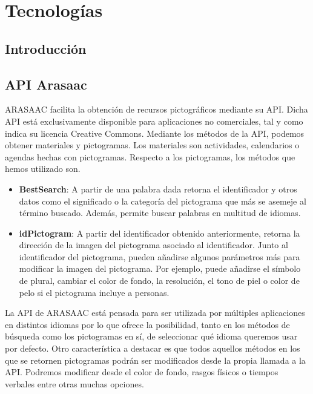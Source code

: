 \chapter{Tecnologías}
\label{cap:introduccion}


\begin{resumen}
	
\end{resumen}

\label{cap1:sec:Motivacion}


\section{Introducción}

\section{API Arasaac}
ARASAAC facilita la obtención de recursos pictográficos mediante su API. Dicha API está exclusivamente disponible para aplicaciones no comerciales, tal y como indica su licencia Creative Commons.
Mediante los métodos de la API, podemos obtener materiales y pictogramas. Los materiales  son actividades, calendarios o agendas hechas con pictogramas. Respecto a los pictogramas, los métodos que hemos utilizado son.
\begin{itemize}
	\item \textbf{BestSearch}: A partir de una palabra dada retorna el identificador y otros datos como el significado o la categoría del pictograma que más se asemeje al término buscado. Además, permite buscar palabras en multitud de idiomas.
	
	\item \textbf{idPictogram}: A partir del identificador obtenido anteriormente, retorna la dirección de la imagen del pictograma asociado al identificador. Junto al identificador del pictograma, pueden añadirse algunos parámetros más para modificar la imagen del pictograma. Por ejemplo, puede añadirse el símbolo de plural, cambiar el color de fondo, la resolución, el tono de piel o color de pelo si el pictograma incluye a personas.
		
\end{itemize}

La API de ARASAAC está pensada para ser utilizada por múltiples aplicaciones en distintos idiomas por lo que ofrece la posibilidad, tanto en los métodos de búsqueda como los pictogramas en sí, de seleccionar qué idioma queremos usar por defecto.
Otro característica a destacar es que todos aquellos métodos en los que se retornen pictogramas podrán ser modificados desde la propia llamada a la API. Podremos modificar desde el color de fondo, rasgos físicos o tiempos verbales entre otras muchas opciones.

